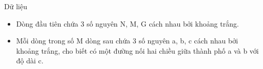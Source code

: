Dữ liệu  
\begin{itemize}
	\item     Dòng đầu tiên chứa 3 số nguyên N, M, G cách nhau bởi khoảng trắng.   
	\item     Mỗi dòng trong số M dòng sau chứa 3 số nguyên a, b, c cách nhau bởi khoảng trắng, cho biết có một đường nối hai chiều giữa thành phố a và b với độ dài c.   
\end{itemize}